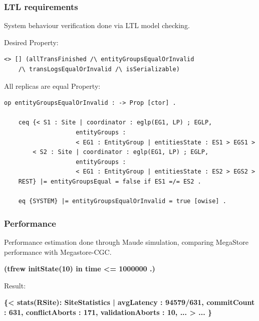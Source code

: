 \documentclass{beamer}
\begin{document}
\begin{frame}[fragile]
    \frametitle{LTL requirements}
    System behaviour verification done via LTL model checking.
    
    \bigskip
    Desired Property: 
    \begin{lstlisting}[language=maude, basicstyle=\scriptsize]
    <> [] (allTransFinished /\ entityGroupsEqualOrInvalid
    /\ transLogsEqualOrInvalid /\ isSerializable)
    \end{lstlisting}

    All replicas are equal Property:
    \begin{lstlisting}[language=maude, basicstyle=\scriptsize]
    op entityGroupsEqualOrInvalid : -> Prop [ctor] .
    
    ceq {< S1 : Site | coordinator : eglp(EG1, LP) ; EGLP,
                    entityGroups :
                    < EG1 : EntityGroup | entitiesState : ES1 > EGS1 >
        < S2 : Site | coordinator : eglp(EG1, LP) ; EGLP,
                    entityGroups :
                    < EG1 : EntityGroup | entitiesState : ES2 > EGS2 >
    REST} |= entityGroupsEqual = false if ES1 =/= ES2 .
    
    eq {SYSTEM} |= entityGroupsEqualOrInvalid = true [owise] .
    \end{lstlisting}
\end{frame}
\begin{frame}
    \frametitle{Performance}
    Performance estimation done through Maude simulation, comparing MegaStore performance with Megastore-CGC.
    \begin{center}
        \textbf{(tfrew initState(10) in time <= 1000000 .)}
    \end{center}

    Result:
    \begin{center}
    \textbf{\{< stats(RSite): SiteStatistics | avgLatency : 94579/631, commitCount : 631,
conflictAborts : 171, validationAborts : 10, ... > ... \}}
    \end{center} 
\end{frame} 
\end{document}

